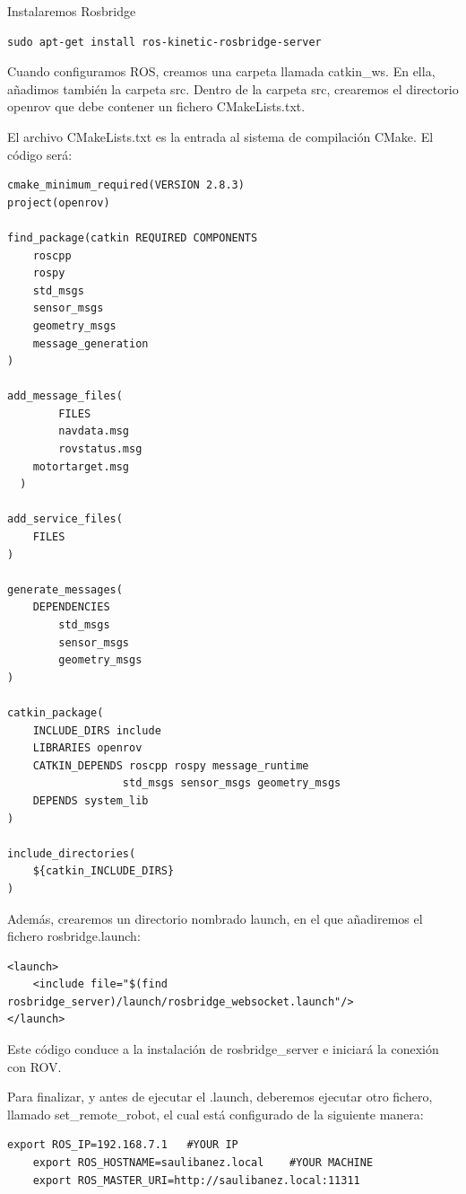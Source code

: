 Instalaremos Rosbridge
\begin{lstlisting}[caption=Rosbridge, label={lst:rosbridge}]
sudo apt-get install ros-kinetic-rosbridge-server
\end{lstlisting}

Cuando configuramos ROS, creamos una carpeta llamada catkin\_ws. En ella, añadimos también la carpeta src. Dentro de la carpeta src, crearemos el directorio openrov que debe contener un fichero CMakeLists.txt.

El archivo CMakeLists.txt es la entrada al sistema de compilación CMake. El código será:

\begin{lstlisting}[caption=CMakeLists.txt, label={lst:cmakelists}]
cmake_minimum_required(VERSION 2.8.3)
project(openrov)

find_package(catkin REQUIRED COMPONENTS
  	roscpp
  	rospy
  	std_msgs
 	sensor_msgs
  	geometry_msgs
  	message_generation
)

add_message_files(
    	FILES
    	navdata.msg
    	rovstatus.msg
   	motortarget.msg
  )

add_service_files(
    FILES
)

generate_messages(
	DEPENDENCIES
    	std_msgs
    	sensor_msgs
    	geometry_msgs
)

catkin_package(
   	INCLUDE_DIRS include
   	LIBRARIES openrov
   	CATKIN_DEPENDS roscpp rospy message_runtime
                  std_msgs sensor_msgs geometry_msgs
   	DEPENDS system_lib
)

include_directories(
  	${catkin_INCLUDE_DIRS}
)
\end{lstlisting}


Además, crearemos un directorio nombrado launch, en el que añadiremos el fichero rosbridge.launch:

\begin{lstlisting}[caption=websocket.launch, label={lst:launch}]
<launch>
 	<include file="$(find rosbridge_server)/launch/rosbridge_websocket.launch"/>
</launch>
\end{lstlisting}

Este código conduce a la instalación de rosbridge\_server e iniciará la conexión con ROV.

Para finalizar, y antes de ejecutar el .launch, deberemos ejecutar otro fichero, llamado set\_remote\_robot, el cual está configurado de la siguiente manera:
\begin{lstlisting}[caption=set\_remote\_robot, label={lst:remote}]
	export ROS_IP=192.168.7.1 	#YOUR IP
	export ROS_HOSTNAME=saulibanez.local 	#YOUR MACHINE
	export ROS_MASTER_URI=http://saulibanez.local:11311
\end{lstlisting}

